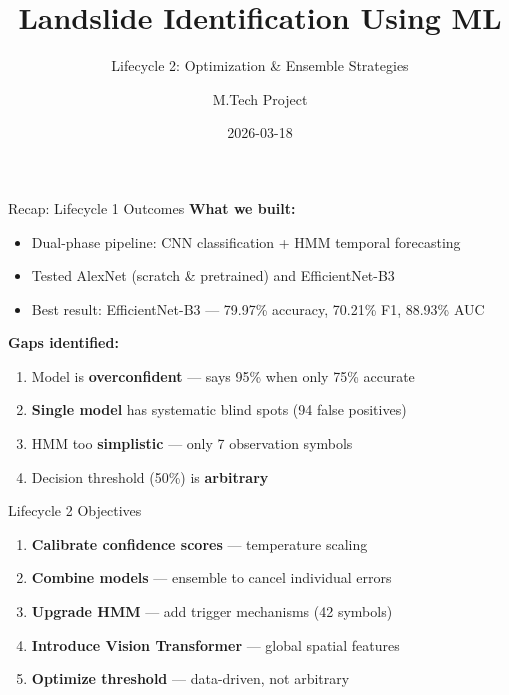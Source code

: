 \documentclass[aspectratio=169]{beamer}
\title{Landslide Identification Using ML}
\subtitle{Lifecycle 2: Optimization \& Ensemble Strategies}
\author{M.Tech Project}
\date{2026-03-18}
\begin{document}
\begin{frame}
    \titlepage
\end{frame}

\begin{frame}{Recap: Lifecycle 1 Outcomes}
    \textbf{What we built:}
    \begin{itemize}
        \item Dual-phase pipeline: CNN classification + HMM temporal forecasting
        \item Tested AlexNet (scratch \& pretrained) and EfficientNet-B3
        \item Best result: EfficientNet-B3 --- 79.97\% accuracy, 70.21\% F1, 88.93\% AUC
    \end{itemize}

    \vspace{0.4cm}
    \textbf{Gaps identified:}
    \begin{enumerate}
        \item Model is \textbf{overconfident} --- says 95\% when only 75\% accurate
        \item \textbf{Single model} has systematic blind spots (94 false positives)
        \item HMM too \textbf{simplistic} --- only 7 observation symbols
        \item Decision threshold (50\%) is \textbf{arbitrary}
    \end{enumerate}
\end{frame}

\begin{frame}{Lifecycle 2 Objectives}
    \begin{enumerate}
        \item \textbf{Calibrate confidence scores} --- temperature scaling
        \item \textbf{Combine models} --- ensemble to cancel individual errors
        \item \textbf{Upgrade HMM} --- add trigger mechanisms (42 symbols)
        \item \textbf{Introduce Vision Transformer} --- global spatial features
        \item \textbf{Optimize threshold} --- data-driven, not arbitrary
    \end{enumerate}
\end{frame}
\end{document}
